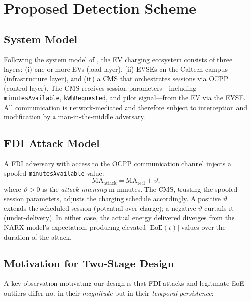 \documentclass[journal]{IEEEtran}
\newcommand{\eoe}{\mathrm{EoE}}
\begin{document}
\section{Proposed Detection Scheme}
\label{sec:proposed}

\subsection{System Model}
Following the system model of \cite{basumatary2025}, the EV charging
ecosystem consists of three layers: (i) one or more EVs (load layer),
(ii) EVSEs on the Caltech campus (infrastructure layer), and (iii) a
CMS that orchestrates sessions via OCPP (control layer). The CMS
receives session parameters---including \texttt{minutesAvailable},
\texttt{kWhRequested}, and pilot signal---from the EV via the EVSE.
All communication is network-mediated and therefore subject to
interception and modification by a man-in-the-middle adversary.

\subsection{FDI Attack Model}
\label{ssec:attackmodel}
A FDI adversary with access to the OCPP communication channel injects
a spoofed \texttt{minutesAvailable} value:
\begin{equation}
\mathrm{MA}_{\mathrm{attack}} = \mathrm{MA}_{\mathrm{real}} \pm \vartheta,
\label{eq:attackmodel}
\end{equation}
where $\vartheta > 0$ is the \emph{attack intensity} in minutes. The
CMS, trusting the spoofed session parameters, adjusts the charging
schedule accordingly. A positive $\vartheta$ extends the scheduled
session (potential over-charge); a negative $\vartheta$ curtails it
(under-delivery). In either case, the actual energy delivered diverges
from the NARX model's expectation, producing elevated $|\eoe(t)|$
values over the duration of the attack.

\subsection{Motivation for Two-Stage Design}
\label{ssec:motivation}

A key observation motivating our design is that FDI attacks and
legitimate EoE outliers differ not in their \emph{magnitude} but in
their \emph{temporal persistence}:
\end{document}
